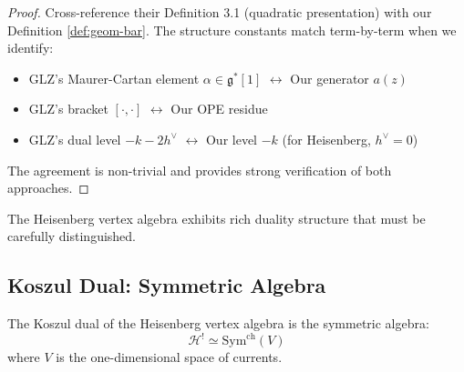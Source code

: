 \begin{proof}
Cross-reference their Definition 3.1 (quadratic presentation) with our Definition \ref{def:geom-bar}. The structure constants match term-by-term when we identify:
\begin{itemize}
\item GLZ's Maurer-Cartan element $\alpha \in \mathfrak{g}^*[1]$ $\leftrightarrow$ Our generator $a(z)$
\item GLZ's bracket $[\cdot,\cdot]$ $\leftrightarrow$ Our OPE residue
\item GLZ's dual level $-k-2h^\vee$ $\leftrightarrow$ Our level $-k$ (for Heisenberg, $h^\vee=0$)
\end{itemize}

The agreement is non-trivial and provides strong verification of both approaches.
\end{proof}

The Heisenberg vertex algebra exhibits rich duality structure that must be carefully distinguished.

\subsection{Koszul Dual: Symmetric Algebra}

\begin{theorem}\label{thm:heisenberg-koszul-correct}
The Koszul dual of the Heisenberg vertex algebra is the symmetric algebra:
$$\mathcal{H}^! \simeq \text{Sym}^{\text{ch}}(V)$$
where $V$ is the one-dimensional space of currents.
\end{theorem}

